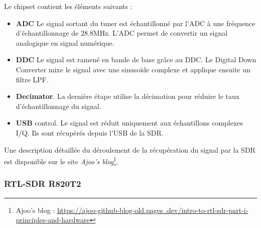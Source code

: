 \vspace{0.1cm}

Le chipset contient les éléments suivants :
\begin{itemize}
\item \textbf{\ac{ADC}} Le signal sortant du tuner est échantillonné par l'ADC à une fréquence d'échantillonnage de 28.8MHz. L'\ac{ADC} permet de convertir un signal analogique en signal numérique.
\item \textbf{\ac{DDC}} Le signal est ramené en bande de base grâce au DDC. Le Digital Down Converter mixe le signal avec une sinusoïde complexe et applique ensuite un filtre \ac{LPF}. 
\item \textbf{Decimator}. La dernière étape utilise la décimation pour réduire le taux d'échantillonnage du signal.
\item \textbf{\ac{USB}} control. Le signal est réduit uniquement aux échantillons complexes \ac{I/Q}. Ils sont récupérés depuis l'\ac{USB} de la \ac{SDR}.
\end{itemize}

\vspace{0.1cm}

Une description détaillée du déroulement de la récupération du signal par la \ac{SDR} est disponible sur le site \textit{Ajoo's blog}\footnote{Ajoo's blog : \href{https://ajoo-github-blog-old.pages.dev/intro-to-rtl-sdr-part-i-principles-and-hardware}{https://ajoo-github-blog-old.pages
.dev/intro-to-rtl-sdr-part-i-principles-and-hardware}}.




\subsubsection{RTL-SDR R820T2}

